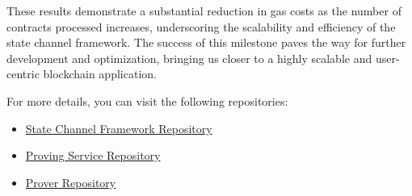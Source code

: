 \documentclass[11pt,a4paper]{article}
\begin{document}
These results demonstrate a substantial reduction in gas costs as the number of contracts processed increases, underscoring the scalability and efficiency of the state channel framework. The success of this milestone paves the way for further development and optimization, bringing us closer to a highly scalable and user-centric blockchain application.

For more details, you can visit the following repositories:
\begin{itemize}
    \item \href{https://github.com/neotheprogramist/state-channel-framework}{State Channel Framework Repository}
    \item \href{https://github.com/neotheprogramist/http-prover}{Proving Service Repository}
    \item \href{https://github.com/cartridge-gg/stone-prover/tree/docker/both-cairo-versions}{Prover Repository}
\end{itemize}
\end{document}
